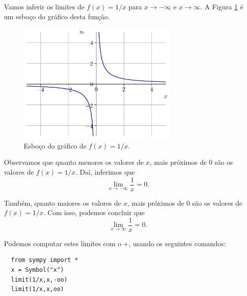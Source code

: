 \begin{ex}
  Vamos inferir os limites de $f(x) = 1/x$ para $x\to -\infty$ e $x\to \infty$. A Figura \ref{fig:lim_xinf_1x} é um esboço do gráfico desta função.

\begin{figure}[H]
  \centering
  \includegraphics[width=0.7\textwidth]{./cap_lim/dados/fig_lim_xinf_1x/fig_lim_xinf_1x}
  \caption{Esboço do gráfico de $f(x) = 1/x$.}
  \label{fig:lim_xinf_1x}
\end{figure}

Observamos que quanto menores os valores de $x$, mais próximos de $0$ são os valores de $f(x)=1/x$. Daí, inferimos que
\begin{equation}
  \lim_{x\to -\infty} \frac{1}{x} = 0.
\end{equation}

Também, quanto maiores os valores de $x$, mais próximos de $0$ são os valores de $f(x)=1/x$. Com isso, podemos concluir que
\begin{equation}
  \lim_{x\to \infty} \frac{1}{x} = 0.
\end{equation}

\ifispython
Podemos computar estes limites com o {\python}+{\sympy}, usando os seguintes comandos:
\begin{lstlisting}
  from sympy import *
  x = Symbol("x")
  limit(1/x,x,-oo)
  limit(1/x,x,oo)
\end{lstlisting}
\fi
\end{ex}

